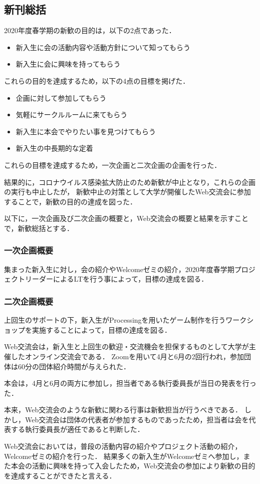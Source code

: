 \subsection*{新刊総括}


2020年度春学期の新歓の目的は，以下の2点であった．

\begin{itemize}
    \item 新入生に会の活動内容や活動方針について知ってもらう
    \item 新入生に会に興味を持ってもらう
\end{itemize}

これらの目的を達成するため，以下の4点の目標を掲げた．

\begin{itemize}
    \item 企画に対して参加してもらう
    \item 気軽にサークルルームに来てもらう
    \item 新入生に本会でやりたい事を見つけてもらう
    \item 新入生の中長期的な定着
\end{itemize}

これらの目標を達成するため，一次企画と二次企画の企画を行った．

結果的に，コロナウイルス感染拡大防止のため新歓が中止となり，これらの企画の実行も中止したが，
新歓中止の対策として大学が開催したWeb交流会に参加することで，新歓の目的の達成を図った．

以下に，一次企画及び二次企画の概要と，Web交流会の概要と結果を示すことで，新歓総括とする．

\subsubsection*{一次企画概要}
集まった新入生に対し，会の紹介やWelcomeゼミの紹介，2020年度春学期プロジェクトリーダーによるLTを行う事によって，目標の達成を図る．

\subsubsection*{二次企画概要}
上回生のサポートの下，新入生がProcessingを用いたゲーム制作を行うワークショップを実施することによって，目標の達成を図る．

Web交流会は，新入生と上回生の歓迎・交流機会を担保するものとして大学が主催したオンライン交流会である．
Zoomを用いて4月と6月の2回行われ，参加団体は60分の団体紹介時間が与えられた．

本会は，4月と6月の両方に参加し，担当者である執行委員長が当日の発表を行った．

本来，Web交流会のような新歓に関わる行事は新歓担当が行うべきである．
しかし，Web交流会は団体の代表者が参加するものであったため，担当者は会を代表する執行委員長が適任であると判断した．

Web交流会においては，普段の活動内容の紹介やプロジェクト活動の紹介，Welcomeゼミの紹介を行った．
結果多くの新入生がWelcomeゼミへ参加し，また本会の活動に興味を持って入会したため，Web交流会の参加により新歓の目的を達成することができたと言える．

